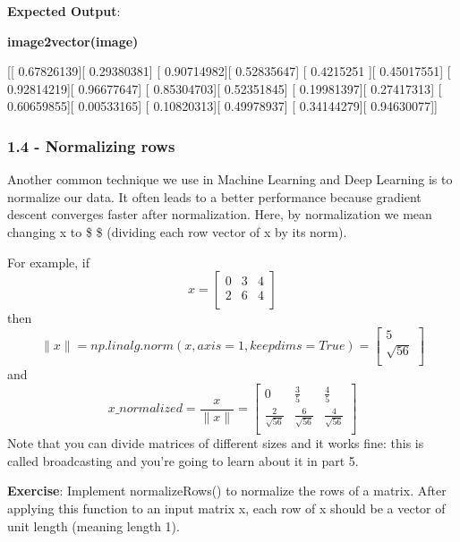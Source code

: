 \documentclass[11pt]{article}
\begin{document}
    \textbf{Expected Output}:

\textbf{image2vector(image)}

{[}{[} 0.67826139{]}{[} 0.29380381{]} {[} 0.90714982{]}{[} 0.52835647{]}
{[} 0.4215251 {]}{[} 0.45017551{]} {[} 0.92814219{]}{[} 0.96677647{]}
{[} 0.85304703{]}{[} 0.52351845{]} {[} 0.19981397{]}{[} 0.27417313{]}
{[} 0.60659855{]}{[} 0.00533165{]} {[} 0.10820313{]}{[} 0.49978937{]}
{[} 0.34144279{]}{[} 0.94630077{]}{]}

    \subsubsection{1.4 - Normalizing rows}\label{normalizing-rows}

Another common technique we use in Machine Learning and Deep Learning is
to normalize our data. It often leads to a better performance because
gradient descent converges faster after normalization. Here, by
normalization we mean changing x to \$  \$ (dividing
each row vector of x by its norm).

For example, if \[x = 
\begin{bmatrix}
    0 & 3 & 4 \\
    2 & 6 & 4 \\
\end{bmatrix}\tag{3}\] then
\[\| x\| = np.linalg.norm(x, axis = 1, keepdims = True) = \begin{bmatrix}
    5 \\
    \sqrt{56} \\
\end{bmatrix}\tag{4} \]and
\[ x\_normalized = \frac{x}{\| x\|} = \begin{bmatrix}
    0 & \frac{3}{5} & \frac{4}{5} \\
    \frac{2}{\sqrt{56}} & \frac{6}{\sqrt{56}} & \frac{4}{\sqrt{56}} \\
\end{bmatrix}\tag{5}\] Note that you can divide matrices of different
sizes and it works fine: this is called broadcasting and you're going to
learn about it in part 5.

\textbf{Exercise}: Implement normalizeRows() to normalize the rows of a
matrix. After applying this function to an input matrix x, each row of x
should be a vector of unit length (meaning length 1).
\end{document}
